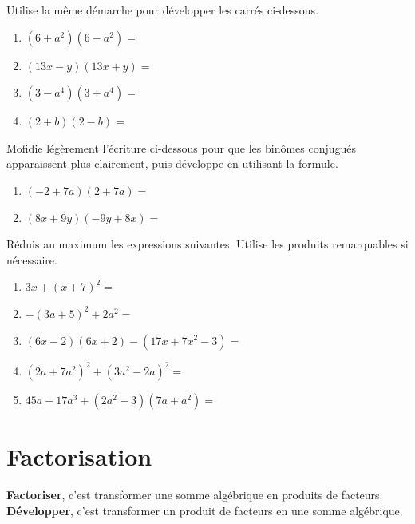 \documentclass[../math2.tex]{subfiles}
\begin{document}
\begin{exercise}
  Utilise la même démarche pour développer les carrés ci-dessous.
  \begin{enumerate}[cols=2, itemsep=2cm]
    \item  $\left(6+a^2\right)\left(6-a^2\right)=$
    \item  $\left(13x-y\right)\left(13x+y\right)=$
    \item  $\left(3-a^4\right)\left(3+a^4\right)=$
    \item  $\left(2+b\right)\left(2-b\right)=$
  \end{enumerate}
\end{exercise}

\newpage
\begin{exercise}
  Mofidie légèrement l'écriture ci-dessous pour que les binômes conjugués apparaissent plus clairement, puis développe en utilisant la formule.
  \begin{enumerate}[cols=2]
    \item  $\left(-2+7a\right)\left(2+7a\right)=$
    \item  $\left(8x+9y\right)\left(-9y+8x\right)=$
  \end{enumerate}
\end{exercise}
\vspace*{1cm}

\begin{exercise}
  Réduis au maximum les expressions suivantes. Utilise les produits remarquables si nécessaire.
  \begin{enumerate}[itemsep=3.7cm]
    \item $3x+\left(x+7\right)^2=$
    \item $-\left(3a+5\right)^2 + 2a^2=$
    \item $\left(6x-2\right)\left(6x+2\right) - \left(17x+7x^2-3\right)=$
    \item $\left(2a+7a^2\right)^2 + \left(3a^2-2a\right)^2=$
    \item $45a-17a^3+\left(2a^2-3\right)\left(7a+a^2\right)=$
  \end{enumerate}
\end{exercise}

\newpage
\section{Factorisation}

\textbf{Factoriser}, c'est transformer une somme algébrique en produits de facteurs. \\
\textbf{Développer}, c'est transformer un produit de facteurs en une somme algébrique.
\vspace*{3.9cm}
\end{document}
